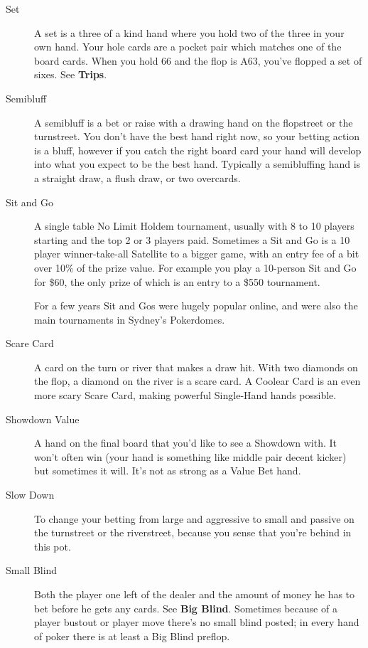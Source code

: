 \begin{description}
\item[Set] A set is a three of a kind hand where you hold two of the
three in your own hand. Your hole cards are a pocket pair which
matches one of the board cards. When you hold 66 and the flop is A63,
you've flopped a set of sixes. See \textbf{Trips}.

\item[Semibluff] A semibluff is a bet or raise with a drawing hand on
the flopstreet or the turnstreet. You don't have the best hand right
now, so your betting action is a bluff, however if you catch the right
board card your hand will develop into what you expect to be the best
hand. Typically a semibluffing hand is a straight draw, a flush draw,
or two overcards.

\item[Sit and Go] A single table No Limit Holdem tournament, usually
with 8 to 10 players starting and the top 2 or 3 players
paid. Sometimes a Sit and Go is a 10 player winner-take-all
Satellite to a bigger game, with an entry fee of a
bit over 10\% of the prize value. For example you play a 10-person
Sit and Go for \$60, the only prize of which is an entry to a \$550
tournament.

For a few years Sit and Gos were hugely popular online, and were also
the main tournaments in Sydney's Pokerdomes.

\item[Scare Card] A card on the turn or river that makes a draw hit.
With two diamonds on the flop, a diamond on the river is a scare card.
A Coolear Card is an even more scary Scare Card, making powerful
Single-Hand hands possible.

\item[Showdown Value] A hand on the final board that you'd like to see
a Showdown with. It won't often win (your hand is something like
middle pair decent kicker) but sometimes it will. It's not as strong
as a Value Bet hand.

\item[Slow Down] To change your betting from large and aggressive
to small and passive on the turnstreet or the riverstreet, because
you sense that you're behind in this pot.

\item[Small Blind] Both the player one left of the dealer and the
amount of money he has to bet before he gets any cards. See
\textbf{Big Blind}. Sometimes because of a player bustout or player
move there's no small blind posted; in every hand of poker there is at
least a Big Blind preflop.


\end{description}

